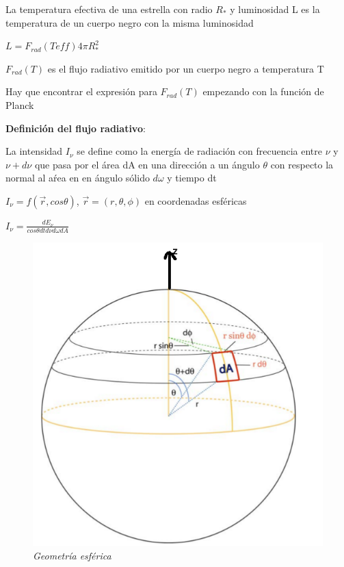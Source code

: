 \documentclass[10pt]{book}
\begin{document}
La temperatura efectiva de una  estrella con radio $R_{*}$ y luminosidad L es la temperatura de un cuerpo negro con la misma luminosidad

$L = F_{rad}(Teff)  4 \pi R_{*}^2$

$F_{rad}(T)$ es el flujo radiativo emitido por un cuerpo negro a temperatura T

Hay que encontrar el expresión para  $F_{rad}(T) $ empezando con la función de Planck 

\textbf{Definición del flujo radiativo}:

La intensidad $I_{\nu}$ se define como la energía de radiación  con frecuencia entre $\nu$ y $\nu + d\nu$ que pasa por el área dA 
en una dirección a un ángulo 
$\theta$ con respecto la normal al aŕea  en en ángulo sólido $d\omega$ y tiempo dt

$I_{\nu} = f(\vec{r}, cos \theta)$, $\vec{r} = (r, \theta, \phi)$ en coordenadas esféricas

$I_{\nu} = \frac{dE_{\nu}}{cos \theta dt d\nu d\omega dA} $


\begin{figure}[!ht]
 \centering
 \includegraphics[scale=0.4]{sph.png}
 \caption{\emph{Geometría esférica}}
\end{figure}
\end{document}
